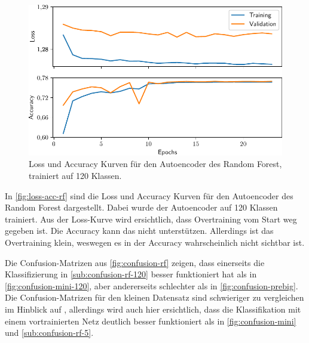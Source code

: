 \begin{figure}
  \centering
  \includegraphics[scale=0.8]{pics/ergebnisse/RF/history.pdf}
  \caption{Loss und Accuracy Kurven für den Autoencoder des Random Forest,
  trainiert auf 120 Klassen.}
  \label{fig:loss-acc-rf}
\end{figure}

In \autoref{fig:loss-acc-rf} sind die Loss und Accuracy Kurven für den Autoencoder
des Random Forest dargestellt. Dabei wurde der Autoencoder auf 120 Klassen trainiert.
Aus der Loss-Kurve wird ersichtlich, dass Overtraining vom Start weg gegeben ist.
Die Accuracy kann das nicht unterstützen. Allerdings ist das Overtraining klein,
weswegen es in der Accuracy wahrscheinlich nicht sichtbar ist.

Die Confusion-Matrizen aus \autoref{fig:confusion-rf} zeigen, dass einerseits
die Klassifizierung in \autoref{sub:confusion-rf-120} besser funktioniert hat
als in \autoref{fig:confusion-mini-120}, aber andererseits schlechter als in
\autoref{fig:confusion-prebig}. Die Confusion-Matrizen für den kleinen Datensatz
sind schwieriger zu vergleichen im Hinblick auf \MiniDog{}, allerdings wird auch
hier ersichtlich, dass die Klassifikation mit einem vortrainierten Netz deutlich
besser funktioniert als in \autoref{fig:confusion-mini} und
\autoref{sub:confusion-rf-5}.

